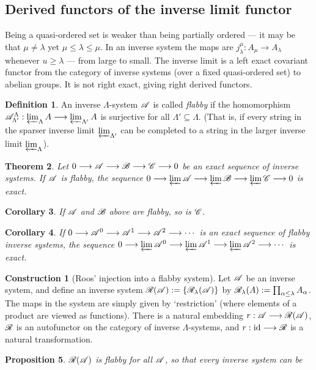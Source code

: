 \documentclass[11pt]{article}
\renewcommand{\comment}{}
\theoremstyle{plain}
\newtheorem{thm}{Theorem}[subsection]
\newtheorem{prop}[thm]{Proposition}
\newtheorem{cor}[thm]{Corollary}
\theoremstyle{definition}
\newtheorem*{const*}{Construction}
\newtheorem{defn}[thm]{Definition}
\begin{document}
\subsection{Derived functors of the inverse limit functor}
\comment{
Being a quasi-ordered set is weaker than being partially ordered --- it may be
that $\mu\neq\lambda$ yet $\mu\leq\lambda\leq\mu$. In an inverse system the maps
are $j^\mu_\lambda:A_\mu\to A_\lambda$ whenever $u\geq\lambda$ --- from large to
small. The inverse limit is a left exact covariant functor from the category of
inverse systems (over a fixed quasi-ordered set) to abelian groups. It is not
right exact, giving right derived functors.
\setcounter{thm}{4}
\begin{defn}
An inverse $\Lambda$-system $\mathscr{A}$ is called \emph{flabby} if the homomorphism
$\mathscr{A}_{\Lambda'}^\Lambda:\varprojlim_\Lambda A\longrightarrow\varprojlim_{\Lambda'} A$ is
surjective for all $\Lambda'\subseteq \Lambda$. (That is, if every string in the
sparser inverse limit $\varprojlim_{\Lambda'}$ can be completed to a string in
the larger inverse limit $\varprojlim_{\Lambda}$).
\end{defn}
\begin{thm}
Let $0\longrightarrow\mathscr{A}\longrightarrow\mathscr{B}\longrightarrow\mathscr{C}\longrightarrow0$ be an exact sequence of inverse systems. If
$\mathscr{A}$ is flabby, the sequence
$0\longrightarrow\varprojlim\mathscr{A}\longrightarrow\varprojlim\mathscr{B}\longrightarrow\varprojlim\mathscr{C}\longrightarrow0$ is exact.
\end{thm}
\begin{cor}
If $\mathscr{A}$ and $\mathscr{B}$ above are flabby, so is $\mathscr{C}$.
\end{cor}
\begin{cor}
If $0\longrightarrow\mathscr{A}^0\longrightarrow\mathscr{A}^1\longrightarrow\mathscr{A}^2\longrightarrow\cdots$ is an exact sequence of flabby
inverse systems, the sequence
$0\longrightarrow\varprojlim\mathscr{A}^0\longrightarrow\varprojlim\mathscr{A}^1\longrightarrow\varprojlim\mathscr{A}^2\longrightarrow\cdots$ is
exact.
\end{cor}
\begin{const*}[Roos' injection into a flabby system]
Let $\mathscr{A}$ be an inverse system, and define an inverse system
$\mathscr{R}(\mathscr{A}):=\{\mathscr{R}_\lambda(\mathscr{A})\}$ by
$\mathscr{R}_\lambda(A):=\prod_{\alpha\leq\lambda}A_\alpha$. The maps in the system
are simply given by `restriction' (where elements of a product are viewed as
functions). There is a natural embedding $r:\mathscr{A}\longrightarrow\mathscr{R}(\mathscr{A})$, $\mathscr{R}$ is an
autofunctor on the category of inverse $\Lambda$-systems, and $r:\textup{id}\longrightarrow\mathscr{R}$ is
a natural transformation.
\end{const*}
\begin{prop}
$\mathscr{R}(\mathscr{A})$ is flabby for all $\mathscr{A}$, so that every inverse system can be

\end{prop}}
\end{document}
